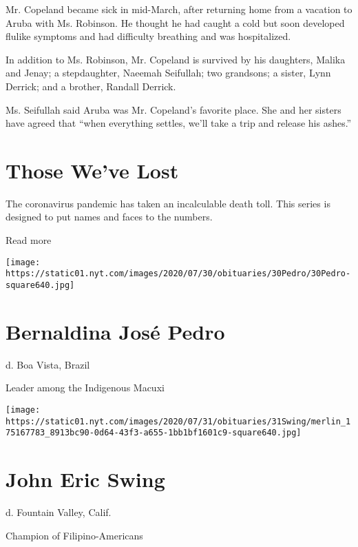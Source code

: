 Mr. Copeland became sick in mid-March, after returning home from a
vacation to Aruba with Ms. Robinson. He thought he had caught a cold but
soon developed flulike symptoms and had difficulty breathing and was
hospitalized.

In addition to Ms. Robinson, Mr. Copeland is survived by his daughters,
Malika and Jenay; a stepdaughter, Naeemah Seifullah; two grandsons; a
sister, Lynn Derrick; and a brother, Randall Derrick.

Ms. Seifullah said Aruba was Mr. Copeland's favorite place. She and her
sisters have agreed that ``when everything settles, we'll take a trip
and release his ashes.''

\href{https://www.nytimes.com/interactive/2020/obituaries/people-died-coronavirus-obituaries.html?action=click\&pgtype=Article\&state=default\&region=BELOW_MAIN_CONTENT\&context=covid_obits_promo}{}

\hypertarget{those-weve-lost}{%
\section{Those We've Lost}\label{those-weve-lost}}

The coronavirus pandemic has taken an incalculable death toll. This
series is designed to put names and faces to the numbers.

Read more

\texttt{[image: https://static01.nyt.com/images/2020/07/30/obituaries/30Pedro/30Pedro-square640.jpg]}

\hypertarget{bernaldina-josuxe9-pedro}{%
\section{Bernaldina José Pedro}\label{bernaldina-josuxe9-pedro}}

d. Boa Vista, Brazil

Leader among the Indigenous Macuxi

\texttt{[image: https://static01.nyt.com/images/2020/07/31/obituaries/31Swing/merlin\_175167783\_8913bc90-0d64-43f3-a655-1bb1bf1601c9-square640.jpg]}

\hypertarget{john-eric-swing}{%
\section{John Eric Swing}\label{john-eric-swing}}

d. Fountain Valley, Calif.

Champion of Filipino-Americans


